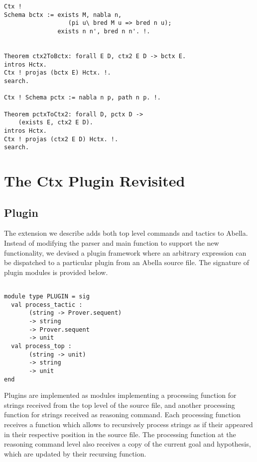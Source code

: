 \documentclass[nocopyrightspace,authoryear]{sigplanconf}
\begin{document}
\begin{itemize}
\begin{lstlisting}
Ctx !
Schema bctx := exists M, nabla n, 
                  (pi u\ bred M u => bred n u);
               exists n n', bred n n'. !.


Theorem ctx2ToBctx: forall E D, ctx2 E D -> bctx E.
intros Hctx. 
Ctx ! projas (bctx E) Hctx. !.
search.

Ctx ! Schema pctx := nabla n p, path n p. !.

Theorem pctxToCtx2: forall D, pctx D -> 
    (exists E, ctx2 E D).
intros Hctx. 
Ctx ! projas (ctx2 E D) Hctx. !. 
search.

\end{lstlisting}


\end{itemize}

\section{The Ctx Plugin Revisited}
\subsection{Plugin}
The extension we describe adds both top level commands and tactics to Abella. Instead of modifying the parser and main function to support the new functionality, we devised a plugin framework where an arbitrary expression can be dispatched to a particular plugin from an Abella source file. The signature of plugin modules is provided below.

\begin{lstlisting}

module type PLUGIN = sig 
  val process_tactic : 
       (string -> Prover.sequent) 
       -> string 
       -> Prover.sequent 
       -> unit
  val process_top : 
       (string -> unit) 
       -> string 
       -> unit
end

\end{lstlisting}

Plugins are implemented as modules implementing a processing function for strings received from the top level of the source file, and another processing function for strings received as reasoning command. Each processing function receives a function which allows to recursively process strings as if their appeared in their respective position in the source file. The processing function at the reasoning command level also receives a copy of the current goal and hypothesis, which are updated by their recursing function.
\end{document}
